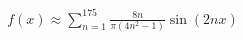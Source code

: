 \documentclass[preview]{standalone}
\begin{document}
\begin{align*}
f(x) \approx \sum_{n=1}^{175} \frac{8n}{\pi(4n^2-1)} \sin(2nx)
\end{align*}
\end{document}
